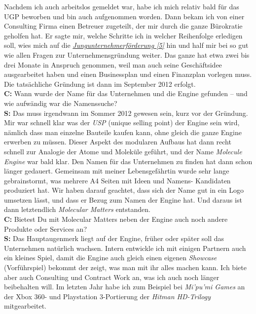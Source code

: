 Nachdem ich auch arbeitslos gemeldet war, habe ich mich relativ bald für das UGP beworben und bin auch aufgenommen worden. Dann bekam ich von einer Consulting Firma einen Betreuer zugeteilt, der mir durch die ganze Bürokratie geholfen hat. Er sagte mir, welche Schritte ich in welcher Reihenfolge erledigen soll, wies mich auf die \href{https://www.gruenderservice.at/Content.Node/gruenden/Jungunternehmerfoerderungen.html}{\textit{Jungunternehmerförderung [5]}} hin und half mir bei so gut wie allen Fragen zur Unternehmensgründung weiter. Das ganze hat etwa zwei bis drei Monate in Anspruch genommen, weil man auch seine Geschäftsidee ausgearbeitet haben und einen Businessplan und einen Finanzplan vorlegen muss. Die tatsächliche Gründung ist dann im September 2012 erfolgt. \\
\textbf{C:} Wann wurde der Name für das Unternehmen und die Engine gefunden – und wie aufwändig war die Namenssuche? \\
\textbf{S:} Das muss irgendwann im Sommer 2012 gewesen sein, kurz vor der Gründung. Mir war schnell klar was der \textit{USP} (unique selling point) der Engine sein wird, nämlich dass man einzelne Bauteile kaufen kann, ohne gleich die ganze Engine erwerben zu müssen. Dieser Aspekt des modularen Aufbaus hat dann recht schnell zur Analogie der Atome und Moleküle geführt, und der Name \textit{Molecule Engine} war bald klar. Den Namen für das Unternehmen zu finden hat dann schon länger gedauert. Gemeinsam mit meiner Lebensgefährtin wurde sehr lange gebrainstormt, was mehrere A4 Seiten mit Ideen und Namens- Kandidaten produziert hat. Wir haben darauf geachtet, dass sich der Name gut in ein Logo umsetzen lässt, und dass er Bezug zum Namen der Engine hat. Und daraus ist dann letztendlich \textit{Molecular Matters} entstanden. \\
\textbf{C:} Bietest Du mit Molecular Matters neben der Engine auch noch andere Produkte oder Services an? \\
\textbf{S:} Das Hauptaugenmerk liegt auf der Engine, früher oder später soll das Unternehmen natürlich wachsen. Intern entwickle ich mit einigen Partnern auch ein kleines Spiel, damit die Engine auch gleich einen eigenen \textit{Showcase} (Vorführspiel) bekommt der zeigt, was man mit ihr alles machen kann. Ich biete aber auch Consulting und Contract Work an, was ich auch noch länger beibehalten will. Im letzten Jahr habe ich zum Beispiel bei \textit{Mi’pu’mi Games} an der Xbox 360- und Playstation 3-Portierung der \textit{Hitman HD-Trilogy} mitgearbeitet.

